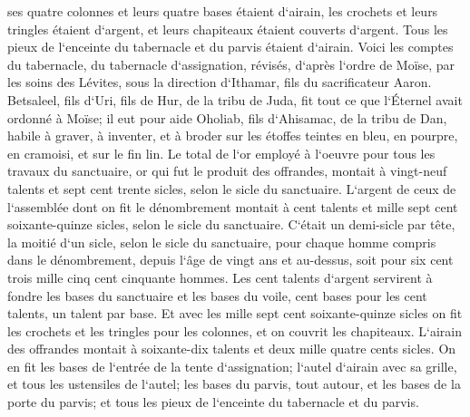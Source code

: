 \verse ses quatre colonnes et leurs quatre bases étaient d`airain, les crochets et leurs tringles étaient d`argent, et leurs chapiteaux étaient couverts d`argent. 
\verse Tous les pieux de l`enceinte du tabernacle et du parvis étaient d`airain. 
\verse Voici les comptes du tabernacle, du tabernacle d`assignation, révisés, d`après l`ordre de Moïse, par les soins des Lévites, sous la direction d`Ithamar, fils du sacrificateur Aaron. 
\verse Betsaleel, fils d`Uri, fils de Hur, de la tribu de Juda, fit tout ce que l`Éternel avait ordonné à Moïse; 
\verse il eut pour aide Oholiab, fils d`Ahisamac, de la tribu de Dan, habile à graver, à inventer, et à broder sur les étoffes teintes en bleu, en pourpre, en cramoisi, et sur le fin lin. 
\verse Le total de l`or employé à l`oeuvre pour tous les travaux du sanctuaire, or qui fut le produit des offrandes, montait à vingt-neuf talents et sept cent trente sicles, selon le sicle du sanctuaire. 
\verse L`argent de ceux de l`assemblée dont on fit le dénombrement montait à cent talents et mille sept cent soixante-quinze sicles, selon le sicle du sanctuaire. 
\verse C`était un demi-sicle par tête, la moitié d`un sicle, selon le sicle du sanctuaire, pour chaque homme compris dans le dénombrement, depuis l`âge de vingt ans et au-dessus, soit pour six cent trois mille cinq cent cinquante hommes. 
\verse Les cent talents d`argent servirent à fondre les bases du sanctuaire et les bases du voile, cent bases pour les cent talents, un talent par base. 
\verse Et avec les mille sept cent soixante-quinze sicles on fit les crochets et les tringles pour les colonnes, et on couvrit les chapiteaux. 
\verse L`airain des offrandes montait à soixante-dix talents et deux mille quatre cents sicles. 
\verse On en fit les bases de l`entrée de la tente d`assignation; l`autel d`airain avec sa grille, et tous les ustensiles de l`autel; 
\verse les bases du parvis, tout autour, et les bases de la porte du parvis; et tous les pieux de l`enceinte du tabernacle et du parvis. 

\chapter{}

